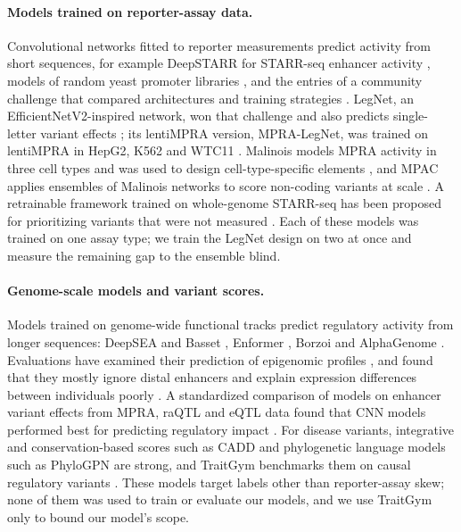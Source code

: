 \documentclass[11pt]{article}
\begin{document}
\paragraph{Models trained on reporter-assay data.} Convolutional networks fitted to reporter measurements predict activity from short sequences, for example DeepSTARR for STARR-seq enhancer activity \cite{almeida2022deepstarr}, models of random yeast promoter libraries \cite{vaishnav2022evolution}, and the entries of a community challenge that compared architectures and training strategies \cite{rafi2024community}. LegNet, an EfficientNetV2-inspired network, won that challenge and also predicts single-letter variant effects \cite{penzar2023legnet}; its lentiMPRA version, MPRA-LegNet, was trained on lentiMPRA in HepG2, K562 and WTC11 \cite{agarwal2025massively}. Malinois models MPRA activity in three cell types and was used to design cell-type-specific elements \cite{gosai2024machineguided}, and MPAC applies ensembles of Malinois networks to score non-coding variants at scale \cite{butts2025identifying}. A retrainable framework trained on whole-genome STARR-seq has been proposed for prioritizing variants that were not measured \cite{venukuttan2026modeling}. Each of these models was trained on one assay type; we train the LegNet design on two at once and measure the remaining gap to the ensemble blind.

\paragraph{Genome-scale models and variant scores.} Models trained on genome-wide functional tracks predict regulatory activity from longer sequences: DeepSEA and Basset \cite{zhou2015predicting,kelley2016basset}, Enformer \cite{avsec2021effective}, Borzoi \cite{linder2025predicting} and AlphaGenome \cite{avsec2026advancing}. Evaluations have examined their prediction of epigenomic profiles \cite{toneyan2022evaluating}, and found that they mostly ignore distal enhancers \cite{karollus2023current} and explain expression differences between individuals poorly \cite{sasse2023benchmarking}. A standardized comparison of models on enhancer variant effects from MPRA, raQTL and eQTL data found that CNN models performed best for predicting regulatory impact \cite{manzo2025comparative}. For disease variants, integrative and conservation-based scores such as CADD \cite{kircher2014general,rentzsch2018cadd} and phylogenetic language models such as PhyloGPN \cite{albors2025phylogenetic} are strong, and TraitGym benchmarks them on causal regulatory variants \cite{benegas2025benchmarking}. These models target labels other than reporter-assay skew; none of them was used to train or evaluate our models, and we use TraitGym only to bound our model's scope.
\end{document}
